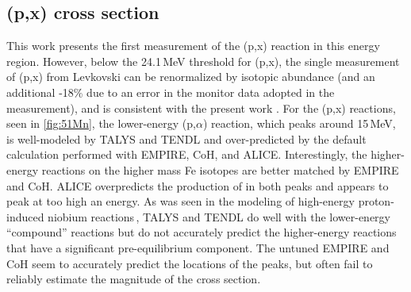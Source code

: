 % 






\subsection{(p,x) cross section}

This work presents the first measurement of the (p,x) reaction in this energy region.
However, below the 24.1\,MeV threshold for (p,x), the single measurement of (p,x) from Levkovski can be renormalized by isotopic abundance (and an additional -18\% due to an error in the monitor data adopted in the measurement), and is consistent  with the present work \cite{levkovski1991cross}.
For the (p,x) reactions, seen in \autoref{fig:51Mn}, the lower-energy  (p,$\alpha$) reaction, which peaks around 15\,MeV, is  well-modeled by TALYS and TENDL and over-predicted by the default calculation performed with  EMPIRE, CoH, and ALICE.
Interestingly, the higher-energy reactions on the higher mass Fe isotopes are better matched by  EMPIRE and CoH.
ALICE overpredicts the production of  in both peaks and appears to peak at too high an energy.
As was seen in the modeling of high-energy proton-induced niobium reactions\,\cite{Voyles2018a}, TALYS and TENDL do well with the lower-energy \enquote{compound} reactions but do not accurately predict the higher-energy reactions that have a significant pre-equilibrium component.
The untuned EMPIRE and CoH seem to accurately predict the locations of the peaks, but often fail to reliably estimate the magnitude of the cross section.

